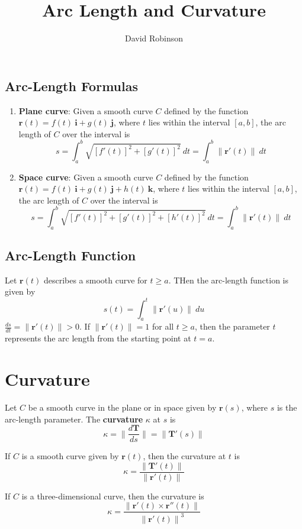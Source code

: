 \documentclass{article}
\title{Arc Length and Curvature}
\author{David Robinson}
\date{}
\begin{document}
\maketitle

\subsection*{Arc-Length Formulas}
\begin{enumerate}
    \item \textbf{Plane curve}: Given a smooth curve $C$ defined by the function $\mathbf{r}(t)=f(t)\:\mathbf{i}+g(t)\:\mathbf{j}$, where $t$ lies within the interval $[a, b]$, the arc length of $C$ over the interval is
    \[s=\int_a^b\sqrt{{[f'(t)]}^2+{[g'(t)]}^2}\: dt=\int_a^b\|\mathbf{r}'(t)\|\: dt\]
    \item \textbf{Space curve}: Given a smooth curve $C$ defined by the function $\mathbf{r}(t)=f(t)\:\mathbf{i}+g(t)\:\mathbf{j}+h(t)\:\mathbf{k}$, where $t$ lies within the interval $[a, b]$, the arc length of $C$ over the interval is
    \[s=\int_a^b\sqrt{{[f'(t)]}^2+{[g'(t)]}^2+{[h'(t)]}^2}\: dt=\int_a^b\|\mathbf{r}'(t)\|\: dt\]
\end{enumerate}

\subsection*{Arc-Length Function}
Let $\mathbf{r}(t)$ describes a smooth curve for $t\geq a$. THen the arc-length function is given by
\[s(t)=\int_a^t\|\mathbf{r}'(u)\|\: du\]
$\frac{ds}{dt}=\|\mathbf{r}'(t)\|>0$. If $\|\mathbf{r}'(t)\|=1$ for all $t\geq a$, then the parameter $t$ represents the arc length from the starting point at $t=a$.

\section*{Curvature}

Let $C$ be a smooth curve in the plane or in space given by $\mathbf{r}(s)$, where $s$ is the arc-length parameter. The \textbf{curvature} $\kappa$ at $s$ is
\[\kappa = \bigg\|\frac{d\mathbf{T}}{ds}\bigg\|=\|\mathbf{T}'(s)\|\]

If $C$ is a smooth curve given by $\mathbf{r}(t)$, then the curvature at $t$ is
\[\kappa = \frac{\|\mathbf{T}'(t)\|}{\|\mathbf{r}'(t)\|}\]

If $C$ is a three-dimensional curve, then the curvature is
\[\kappa = \frac{\|\mathbf{r}'(t)\times \mathbf{r}''(t)\|}{{\|\mathbf{r}'(t)\|}^3}\]
\end{document}
